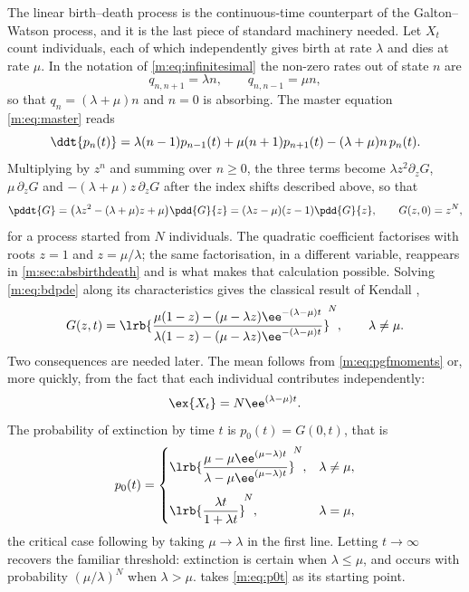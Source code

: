 The linear birth--death process is the continuous-time counterpart of the
Galton--Watson process, and it is the last piece of standard machinery needed.
Let $X_t$ count individuals, each of which independently gives birth at rate
$\lambda$ and dies at rate $\mu$. In the notation of \cref{m:eq:infinitesimal} the
non-zero rates out of state $n$ are
\begin{equation}
\label{m:eq:bdrates}
q_{n,n+1} = \lambda n,
\qquad
q_{n,n-1} = \mu n ,
\end{equation}
so that $q_n = (\lambda+\mu)n$ and $n=0$ is absorbing. The master equation
\cref{m:eq:master} reads
\begin{equation}
\label{m:eq:bdmaster}
\ddt{p_n(t)} = \lambda(n-1)p_{n-1}(t) + \mu(n+1)p_{n+1}(t) - (\lambda+\mu)n\,p_n(t).
\end{equation}
Multiplying by $z^n$ and summing over $n\ge0$, the three terms become
$\lambda z^2\partial_zG$, $\mu\,\partial_zG$ and $-(\lambda+\mu)z\,\partial_zG$
after the index shifts described above, so that
\begin{equation}
\label{m:eq:bdpde}
\pddt{G} = \bigl(\lambda z^2 - (\lambda+\mu)z + \mu\bigr)\pdd{G}{z}
= (\lambda z-\mu)(z-1)\pdd{G}{z},
\qquad G(z,0) = z^{N},
\end{equation}
for a process started from $N$ individuals. The quadratic coefficient factorises
with roots $z=1$ and $z=\mu/\lambda$; the same factorisation, in a different
variable, reappears in \cref{m:sec:absbirthdeath} and is what makes that calculation
possible. Solving \cref{m:eq:bdpde} along its characteristics gives the classical
result of Kendall \cite{Kendall1948},
\begin{equation}
\label{m:eq:bdsolution}
G(z,t) = \lrb{\frac{\mu(1-z) - (\mu-\lambda z)\ee^{-(\lambda-\mu)t}}
{\lambda(1-z) - (\mu-\lambda z)\ee^{-(\lambda-\mu)t}}}^{\!N},
\qquad \lambda\neq\mu .
\end{equation}
Two consequences are needed later. The mean follows from
\cref{m:eq:pgfmoments} or, more quickly, from the fact that each individual
contributes independently:
\begin{equation}
\label{m:eq:bdmean}
\ex{X_t} = N\ee^{(\lambda-\mu)t}.
\end{equation}
The probability of extinction by time $t$ is $p_0(t) = G(0,t)$, that is
\begin{equation}
\label{m:eq:p0t}
p_0(t) =
\begin{cases}
\displaystyle\lrb{\frac{\mu-\mu\ee^{(\mu-\lambda)t}}{\lambda-\mu\ee^{(\mu-\lambda)t}}}^{\!N},
& \lambda\neq\mu,\\[14pt]
\displaystyle\lrb{\frac{\lambda t}{1+\lambda t}}^{\!N},
& \lambda=\mu,
\end{cases}
\end{equation}
the critical case following by taking $\mu\to\lambda$ in the first line. Letting
$t\to\infty$ recovers the familiar threshold: extinction is certain when
$\lambda\le\mu$, and occurs with probability $(\mu/\lambda)^N$ when
$\lambda>\mu$.  takes \cref{m:eq:p0t} as its starting point.
